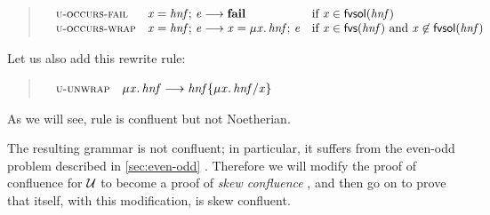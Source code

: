 \begin{quote}
$
\begin{array}{@{\quad}lr@{\;}c@{\;} l l}
  \rulename{u-occurs-fail} & \ensuremath{\Varid{x}\mathrel{=}\mathit{hnf};\,\Varid{e}} & \movesto & \ensuremath{\textbf{fail}} & \text{if $\ensuremath{\Varid{x}} \in \freevarsoutsidelambdas{\ensuremath{\mathit{hnf}}}$} \\
  \rulename{u-occurs-wrap} & \ensuremath{\Varid{x}\mathrel{=}\mathit{hnf};\,\Varid{e}} & \movesto & \ensuremath{\Varid{x}\mathrel{=}\mu\Varid{x}.\,\mathit{hnf};\,\Varid{e}} & \text{if $\ensuremath{\Varid{x}} \in \freevars{\ensuremath{\mathit{hnf}}}$ and $\ensuremath{\Varid{x}} \not\in \freevarsoutsidelambdas{\ensuremath{\mathit{hnf}}}$} \\
\end{array}
$
\end{quote}
Let us also add this rewrite rule:
\begin{quote}
$
\begin{array}{@{\quad}lr@{\;}c@{\;} l l}
  \rulename{u-unwrap} & \ensuremath{\mu\Varid{x}.\,\mathit{hnf}} & \movesto & \ensuremath{\subst{\mathit{hnf}}{\Varid{x}}{\mu\Varid{x}.\,\mathit{hnf}}} \\
\end{array}
$
\end{quote}
As we will see, rule  is confluent but not Noetherian.

The resulting grammar is not confluent; in particular, it suffers from the even-odd problem
described in \cref{sec:even-odd} \cite[Example 4.1]{ariola:skew-confluence}.
Therefore we will modify the proof of confluence for $\mathcal{U}$ to become a proof of \emph{skew confluence} \cite{ariola:skew-confluence},
and then go on to prove that \versecalc{} itself, with this modification, is skew confluent.



